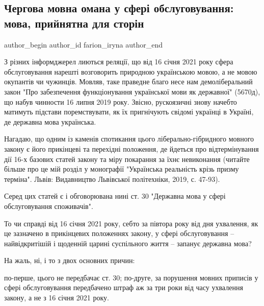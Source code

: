  
 
 
 
 
 
\subsection{Чергова мовна омана у сфері обслуговування: мова, прийнятна для сторін}
\label{sec:10_12_2020.news.ua.pravda.farion_iryna.1.mova}
\ifcmt
	author_begin
   author_id farion_iryna
	author_end
\fi

З різних інформджерел лиються реляції, що від 16 січня 2021 року сфера
обслуговування нарешті возговорить природною українською мовою, а не мовою
окупантів чи чужинців. Мовляв, таке праведне благо несе нам демоліберальний
закон "Про забезпечення функціонування української мови як державної" (5670д),
що набув чинности 16 липня 2019 року. Звісно, рускоязичні знову начебто
матимуть підстави поремствувати, як їх пригнічують свідомі українці в Україні,
де державна мова українська.

Нагадаю, що одним із каменів спотикання цього ліберально-гібридного мовного
закону є його прикінцеві та перехідні положення, де йдеться про відтермінування
дії 16-х базових статей закону та міру покарання за їхнє невиконання (читайте
більше про це мій розділ у монографії "Українська реальність крізь призму
терміна". Львів: Видавництво Львівської політехніки, 2019, с. 47-93).

Серед цих статей є і обговорювана нині ст. 30 "Державна мова у сфері
обслуговування споживачів".

То чи справді від 16 січня 2021 року, себто за півтора року від дня ухвалення,
як це зазначено в прикінцевих положеннях закону, у сфері обслуговування –
найвідкритішій і щоденній царині суспільного життя – запанує державна мова?

На жаль, ні, і то з двох основних причин:

по-перше, цього не передбачає ст. 30; по-друге, за порушення мовних приписів у
сфері обслуговування передбачено штраф аж за три роки від часу ухвалення
закону, а не з 16 січня 2021 року.

